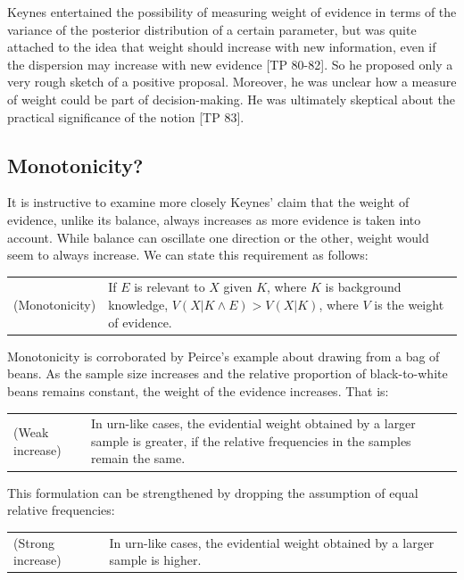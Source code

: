 \documentclass[
  10pt,
  dvipsnames,enabledeprecatedfontcommands]{scrartcl}
\begin{document}
Keynes entertained the possibility of measuring weight of evidence in
terms of the variance of the posterior distribution of a certain
parameter, but was quite attached to the idea that weight should
increase with new information, even if the dispersion may increase with
new evidence {[}TP 80-82{]}. So he proposed only a very rough sketch of
a positive proposal. Moreover, he was unclear how a measure of weight
could be part of decision-making. He was ultimately skeptical about the
practical significance of the notion {[}TP 83{]}.

\hypertarget{monotonicity}{%
\subsection{Monotonicity?}\label{monotonicity}}

It is instructive to examine more closely Keynes' claim that the weight
of evidence, unlike its balance, always increases as more evidence is
taken into account. While balance can oscillate one direction or the
other, weight would seem to always increase. We can state this
requirement as follows:

\vspace{1mm}
\begin{tabular}{lp{9cm}}
(Monotonicity) & If $E$ is relevant to $X$ given $K$, where $K$ is background knowledge, $V(X\vert K \wedge E) > V(X\vert K)$, where $V$ is the weight of evidence.
\end{tabular}
\vspace{1mm}

\noindent Monotonicity is corroborated by Peirce's example about drawing
from a bag of beans. As the sample size increases and the relative
proportion of black-to-white beans remains constant, the weight of the
evidence increases. That is:

\vspace{1mm}
\begin{tabular}{lp{9cm}}
(Weak increase) & In urn-like cases, the evidential weight obtained by a larger sample is greater, if the relative frequencies in the samples remain the same.
\end{tabular}
\vspace{1mm}

\noindent This formulation can be strengthened by dropping the
assumption of equal relative frequencies:

\vspace{1mm}
\begin{tabular}{lp{11cm}}
(Strong increase) & In urn-like cases, the evidential weight obtained by a larger sample is higher.
\end{tabular}
\end{document}
